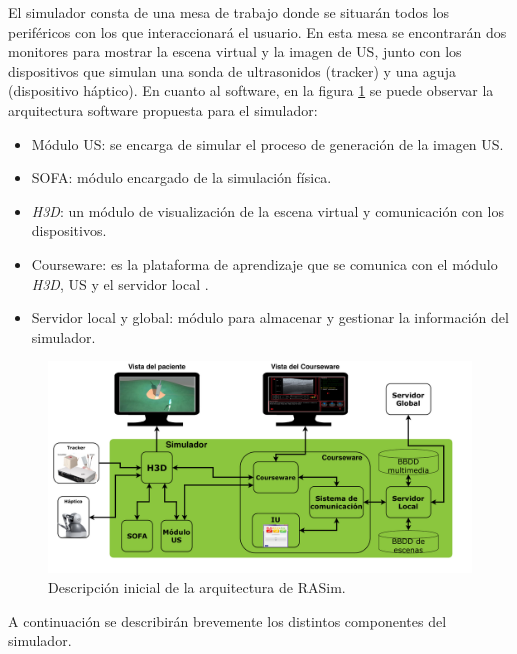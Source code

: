 El simulador consta de una mesa de trabajo donde se situarán todos los periféricos con los que interaccionará el usuario. En esta mesa se encontrarán dos monitores para mostrar la escena virtual y la imagen de \ac{US}, junto con los dispositivos que simulan una sonda de ultrasonidos (\ac{tracker}) y una aguja (dispositivo háptico). En cuanto al software, en la figura \ref{fig:coursearq} se puede observar la arquitectura software propuesta para el simulador: 
\begin{itemize}

    \item Módulo US: se encarga de simular el proceso de generación de la imagen \ac{US}.
    \item \acs{SOFA}: módulo encargado de la simulación física.
    \item \emph{H3D}: un módulo de visualización de la escena virtual y comunicación con los dispositivos.
    \item \acs{Courseware}: es la plataforma de aprendizaje que se comunica con el módulo \emph{H3D}, \ac{US} y el servidor local .
    \item Servidor local y global: módulo para almacenar y gestionar la información del simulador.
\end{itemize}

\begin{figure}[ht]
    \centering
    \includegraphics[width=\textwidth]{IMG/RasimArq.pdf}
    \caption{Descripción inicial de la arquitectura de \acs{RASim}.}
    \label{fig:coursearq}
\end{figure}


A continuación se describirán brevemente los distintos componentes del simulador.




